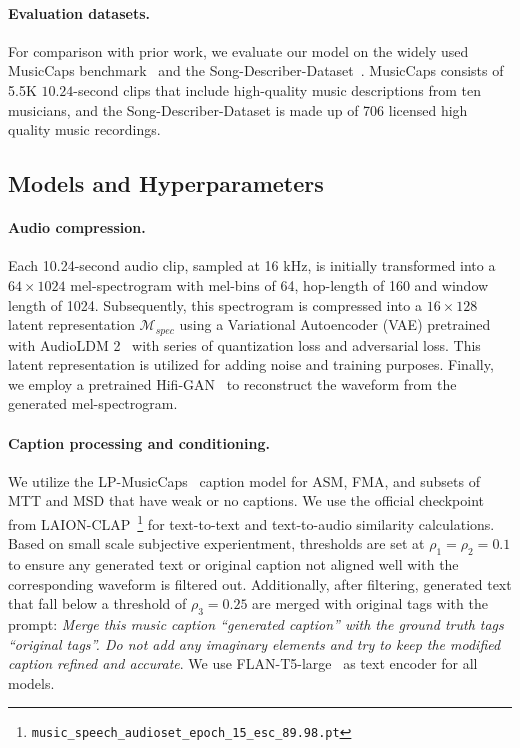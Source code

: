 \paragraph{Evaluation datasets.} For comparison with prior work, we evaluate our model on the widely used MusicCaps benchmark~\citep{agostinelli2023musiclm} and the Song-Describer-Dataset~\citep{manco2023thesong}. MusicCaps consists of 5.5K \(10.24\)-second clips that include high-quality music descriptions from ten musicians, and the Song-Describer-Dataset is made up of 706 licensed high quality music recordings.

\subsection{Models and Hyperparameters}\label{sec:hyperparams}

\paragraph{Audio compression.} 
\label{sec:vae}

Each 10.24-second audio clip, sampled at 16 kHz, is initially transformed into a \(64 \times 1024\) mel-spectrogram with mel-bins of 64, hop-length of 160 and window length of 1024. Subsequently, this spectrogram is compressed into a \(16 \times 128\) latent representation \(\mathcal{M}_{spec}\) using a Variational Autoencoder (VAE) pretrained with AudioLDM 2~\citep{liu2023audioldm2} with series of quantization loss and adversarial loss. This latent representation is utilized for adding noise and training purposes. Finally, we employ a pretrained Hifi-GAN~\citep{kong2020hifi} to reconstruct the waveform from the generated mel-spectrogram.

\paragraph{Caption processing and conditioning.} 
We utilize the LP-MusicCaps~\citep{doh2023lp} caption model for ASM, FMA, and subsets of MTT and MSD that have weak or no captions.
We use the official checkpoint from LAION-CLAP~\citep{laionclap2023}\footnote{\texttt{music\_speech\_audioset\_epoch\_15\_esc\_89.98.pt} } for text-to-text and text-to-audio similarity calculations.
Based on small scale subjective experientment, thresholds are set at \(\rho_1 = \rho_2 = 0.1 \) to ensure any generated text or original caption not aligned well with the corresponding waveform is filtered out. Additionally, after filtering, generated text that fall below a threshold of \(\rho_3 = 0.25 \) are merged with original tags with the prompt: \textit{Merge this music caption ``generated caption'' with the ground truth tags ``original tags''. Do not add any imaginary elements and try to keep the modified caption refined and accurate}. We use FLAN-T5-large~\citep{peebles2023scalable} as text encoder for all models.

